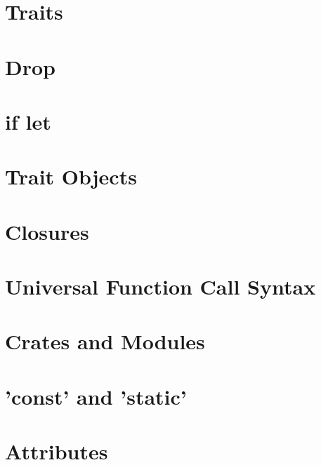 \section{Traits}
\label{sec:syntax_traits}


\section{Drop}
\label{sec:syntax_drop}


\section{if let}
\label{sec:syntax_iflet}


\section{Trait Objects}
\label{sec:syntax_traitObjects}


\section{Closures}
\label{sec:syntax_closures}


\section{Universal Function Call Syntax}
\label{sec:syntax_universalFunctionCallSyntax}


\section{Crates and Modules}
\label{sec:syntax_cratesAndModules}


\section{'const' and 'static'}
\label{sec:syntax_constAndStatic}


\section{Attributes}
\label{sec:syntax_attributes}


